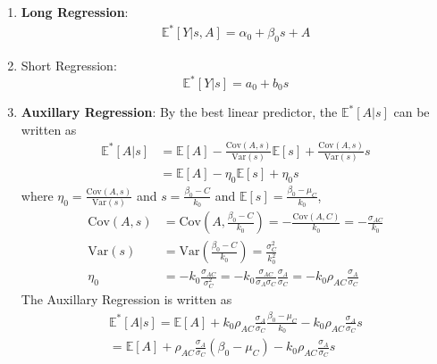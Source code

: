 \documentclass[11pt]{elegantbook}
\begin{document}
\begin{enumerate}
    \item \textbf{Long Regression}:
    \begin{equation}
        \begin{aligned}
            \mathbb{E}^*[Y|s,A]=\alpha_0+\beta_0s+A
        \end{aligned}
        \tag{LR}
        \label{LR}
    \end{equation}
    \item Short Regression: $$\mathbb{E}^*[Y|s]=a_0+b_0s$$
    \item \textbf{Auxillary Regression}: By the best linear predictor, the $\mathbb{E}^*[A|s]$ can be written as
    \begin{equation}
        \begin{aligned}
            \mathbb{E}^*[A|s]&=\mathbb{E}[A]-\frac{\text{Cov}(A,s)}{\text{Var}(s)}\mathbb{E}[s]+\frac{\text{Cov}(A,s)}{\text{Var}(s)}s\\
            &=\mathbb{E}[A]-\eta_0\mathbb{E}[s]+\eta_0 s
        \end{aligned}
        \tag{AR}
        \label{AR}
    \end{equation}
    where $\eta_0=\frac{\text{Cov}(A,s)}{\text{Var}(s)}$ and $s=\frac{\beta_0-C}{k_0}$ and $\mathbb{E}[s]=\frac{\beta_0-\mu_C}{k_0}$,
    \begin{equation}
        \begin{aligned}
            \text{Cov}(A,s)&=\text{Cov}\left(A,\frac{\beta_0-C}{k_0}\right)=-\frac{\text{Cov}(A,C)}{k_0}=-\frac{\sigma_{AC}}{k_0}\\
            \text{Var}(s)&=\text{Var}\left(\frac{\beta_0-C}{k_0}\right)=\frac{\sigma_C^2}{k_0^2}\\
            \eta_0&=-k_0\frac{\sigma_{AC}}{\sigma_C^2}=-k_0\frac{\sigma_{AC}}{\sigma_A\sigma_C}\frac{\sigma_A}{\sigma_C}=-k_0\rho_{AC}\frac{\sigma_A}{\sigma_C}
        \end{aligned}
        \nonumber
    \end{equation}
    The Auxillary Regression is written as
    \begin{equation}
        \begin{aligned}
            \mathbb{E}^*[A|s]=\mathbb{E}[A]+k_0\rho_{AC}\frac{\sigma_A}{\sigma_C}\frac{\beta_0-\mu_C}{k_0}-k_0\rho_{AC}\frac{\sigma_A}{\sigma_C} s\\
            =\mathbb{E}[A]+\rho_{AC}\frac{\sigma_A}{\sigma_C}(\beta_0-\mu_C)-k_0\rho_{AC}\frac{\sigma_A}{\sigma_C} s
        \end{aligned}

\end{equation}
\end{enumerate}
\end{document}
